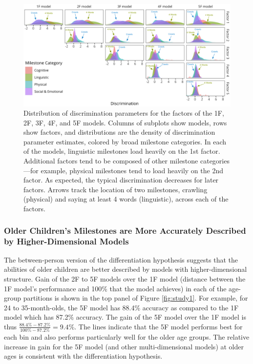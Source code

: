 \documentclass[man, floatsintext]{apa7}
\begin{document}
\begin{figure}
\centering
\includegraphics[width=\columnwidth]{figures/models_new.png}
\caption{Distribution of discrimination parameters for the factors of the 1F, 2F, 3F, 4F, and 5F models. Columns of subplots show models, rows show factors, and distributions are the density of discrimination parameter estimates, colored by broad milestone categories. In each of the models, linguistic milestones load heavily on the 1st factor. Additional factors tend to be composed of other milestone categories—for example, physical milestones tend to load heavily on the 2nd factor. As expected, the typical discrimination decreases for later factors. Arrows track the location of two milestones, crawling (physical) and saying at least 4 words (linguistic), across each of the factors.}
\label{fig:discs}
\end{figure}

\subsubsection{Older Children's Milestones are More Accurately Described
by Higher-Dimensional
Models}

The between-person version of the differentiation
hypothesis suggests that the abilities of older children are better described by models with
higher-dimensional structure. Gain of the 2F to 5F models over the 1F model (distance between the 1F model's performance and 100\% that the model achieves) in each of the age-group partitions is shown in the top panel of Figure \ref{fig:study1}. For example, for
24 to 35-month-olds, the 5F model has 88.4\% accuracy as compared to the
1F model which has 87.2\% accuracy. The gain of the 5F model over the 1F
model is thus $\frac{88.4\% - 87.2\%}{100\% - 87.2\%} = 9.4\%$. The lines indicate that the 5F model performs best for each bin and also performs particularly well for the older age
groups. The relative increase in gain for the 5F model (and other multi-dimensional models) at older ages is consistent with the differentiation hypothesis.
\end{document}
